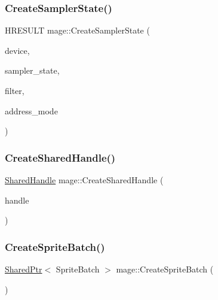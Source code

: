\hypertarget{namespacemage_aba8cfdff9edf018ab6ebe2f3f72a2095}{}\label{namespacemage_aba8cfdff9edf018ab6ebe2f3f72a2095} 
\subsubsection{\texorpdfstring{Create\+Sampler\+State()}{CreateSamplerState()}}
{\footnotesize\ttfamily H\+R\+E\+S\+U\+LT mage\+::\+Create\+Sampler\+State (\begin{DoxyParamCaption}\item[{I\+D3\+D11\+Device2 $\ast$}]{device,  }\item[{I\+D3\+D11\+Sampler\+State $\ast$$\ast$}]{sampler\+\_\+state,  }\item[{D3\+D11\+\_\+\+F\+I\+L\+T\+ER}]{filter,  }\item[{D3\+D11\+\_\+\+T\+E\+X\+T\+U\+R\+E\+\_\+\+A\+D\+D\+R\+E\+S\+S\+\_\+\+M\+O\+DE}]{address\+\_\+mode }\end{DoxyParamCaption})}

\hypertarget{namespacemage_a3119898d7caac71d8ee495c3ae3194b1}{}\label{namespacemage_a3119898d7caac71d8ee495c3ae3194b1} 
\subsubsection{\texorpdfstring{Create\+Shared\+Handle()}{CreateSharedHandle()}}
{\footnotesize\ttfamily \hyperlink{namespacemage_ab892828913d6129acf71e0cec60467e5}{Shared\+Handle} mage\+::\+Create\+Shared\+Handle (\begin{DoxyParamCaption}\item[{H\+A\+N\+D\+LE}]{handle }\end{DoxyParamCaption})}

\hypertarget{namespacemage_a92ceaab9ca632db5c310ca4ab5746685}{}\label{namespacemage_a92ceaab9ca632db5c310ca4ab5746685} 
\subsubsection{\texorpdfstring{Create\+Sprite\+Batch()}{CreateSpriteBatch()}}
{\footnotesize\ttfamily \hyperlink{namespacemage_a1e01ae66713838a7a67d30e44c67703e}{Shared\+Ptr}$<$ Sprite\+Batch $>$ mage\+::\+Create\+Sprite\+Batch (\begin{DoxyParamCaption}{ }\end{DoxyParamCaption})}

